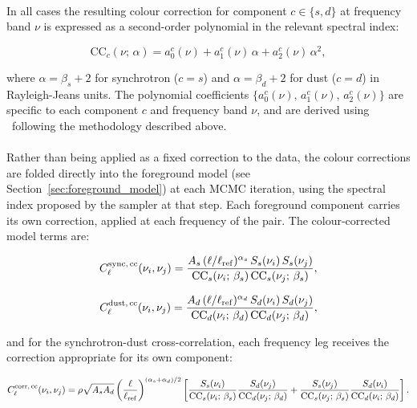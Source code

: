 \paragraph{}

In all cases the resulting colour correction for component $c \in \{s, d\}$ at frequency band $\nu$ is expressed as a second-order polynomial in the relevant spectral index:

\begin{equation}
    \mathrm{CC}_c(\nu;\, \alpha) = a_0^{c}(\nu) + a_1^{c} (\nu)\, \alpha + a_2^{c}(\nu)\, \alpha^2,
\end{equation}

where $\alpha = \beta_s + 2$ for synchrotron ($c = s$) and $\alpha = \beta_d + 2$ for dust ($c = d$) in Rayleigh-Jeans units. The polynomial coefficients $\{a_0^{c}(\nu),\, a_1^{c}(\nu),\, a_2^{c}(\nu)\}$ are specific to each component $c$ and frequency band $\nu$, and are derived using \fastcc\ following the methodology described above.

\paragraph{}

Rather than being applied as a fixed correction to the data, the colour corrections are folded directly into the foreground model (see Section~\ref{sec:foreground_model}) at each MCMC iteration, using the spectral index proposed by the sampler at that step. Each foreground component carries its own correction, applied at each frequency of the pair. The colour-corrected model terms are:

\begin{equation}
    C_\ell^{\rm sync,\,cc}(\nu_i, \nu_j) = \frac{A_s\,(\ell/\ell_{\rm ref})^{\alpha_s}\,S_s(\nu_i)\,S_s(\nu_j)}{\mathrm{CC}_s(\nu_i;\,\beta_s)\,\mathrm{CC}_s(\nu_j;\,\beta_s)},
\end{equation}

\begin{equation}
    C_\ell^{\rm dust,\,cc}(\nu_i, \nu_j) = \frac{A_d\,(\ell/\ell_{\rm ref})^{\alpha_d}\,S_d(\nu_i)\,S_d(\nu_j)}{\mathrm{CC}_d(\nu_i;\,\beta_d)\,\mathrm{CC}_d(\nu_j;\,\beta_d)},
\end{equation}

and for the synchrotron-dust cross-correlation, each frequency leg receives the correction appropriate for its own component:

\begin{equation}
    C_\ell^{\rm corr,\,cc}(\nu_i, \nu_j) = \rho\sqrt{A_s A_d}\left(\frac{\ell}{\ell_{\rm ref}}\right)^{(\alpha_s+\alpha_d)/2}
    \left[
        \frac{S_s(\nu_i)}{\mathrm{CC}_s(\nu_i;\,\beta_s)}\frac{S_d(\nu_j)}{\mathrm{CC}_d(\nu_j;\,\beta_d)}
        +
        \frac{S_s(\nu_j)}{\mathrm{CC}_s(\nu_j;\,\beta_s)}\frac{S_d(\nu_i)}{\mathrm{CC}_d(\nu_i;\,\beta_d)}
    \right].
\end{equation}

